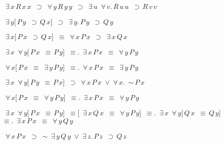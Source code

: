 \begin{description}
\item[\parbox{\textwidth}{X2122\index{X2122@X2122, {\bf Theorem}} }] \texttt{$ $ $\exists \,x \,R \,x \,x $ $\supset $ $\forall \,y \,R \,y \,y $ $\supset $ $\exists \,u $ $\forall \,v . \,R \,u \,u $ $\supset \,R \,v \,v$}


\item[\parbox{\textwidth}{X2123\index{X2123@X2123, {\bf Theorem}} }] \texttt{$ $ $\exists \,y [ \,P \,y $ $\supset \,Q \,x ] $ $\supset $ $\exists \,y . \,P \,y $ $\supset \,Q \,y$}


\item[\parbox{\textwidth}{X2124\index{X2124@X2124, {\bf Theorem}} }] \texttt{$ $ $\exists \,x [ \,P \,x $ $\supset \,Q \,x ] $ $\equiv $ $\forall \,x \,P \,x $ $\supset $ $\exists \,x \,Q \,x$}


\item[\parbox{\textwidth}{X2125\index{X2125@X2125, {\bf Theorem}} }] \texttt{$ $ $\exists \,x $ $\forall \,y [ \,P \,x $ $\equiv \,P \,y ] $ $\equiv . $ $\exists \,x \,P \,x $ $\equiv $ $\forall \,y \,P \,y$}


\item[\parbox{\textwidth}{X2126\index{X2126@X2126, {\bf Theorem}} }] \texttt{$ $ $\forall \,x [ \,P \,x $ $\equiv $ $\exists \,y \,P \,y ] $ $\equiv . $ $\forall \,x \,P \,x $ $\equiv $ $\exists \,y \,P \,y$}


\item[\parbox{\textwidth}{X2127\index{X2127@X2127, {\bf Theorem}} }] \texttt{$ $ $\exists \,x $ $\forall \,y [ \,P \,y $ $\equiv \,P \,x ] $ $\supset $ $\forall \,x \,P \,x $ $\lor $ $\forall \,x . $ $\sim \,P \,x$}


\item[\parbox{\textwidth}{X2128\index{X2128@X2128, {\bf Theorem}} }] \texttt{$ $ $\forall \,x [ \,P \,x $ $\equiv $ $\forall \,y \,P \,y ] $ $\equiv . $ $\exists \,x \,P \,x $ $\equiv $ $\forall \,y \,P \,y$}


\item[\parbox{\textwidth}{X2129\index{X2129@X2129, {\bf Theorem}} }] \texttt{$ $ $\exists \,x $ $\forall \,y [ \,P \,x $ $\equiv \,P \,y ] $ $\equiv [ $ $\exists \,x \,Q \,x $ $\equiv $ $\forall \,y \,P \,y ] $ $\equiv . $ $\exists \,x $ $\forall \,y [ \,Q \,x $ $\equiv \,Q \,y ] $ $\equiv . $ $\exists \,x \,P \,x $ $\equiv $ $\forall \,y \,Q \,y$}


\item[\parbox{\textwidth}{X2130\index{X2130@X2130, {\bf Theorem}} }] \texttt{$ $ $\forall \,x \,P \,x $ $\supset $ $\sim $ $\exists \,y \,Q \,y $ $\lor $ $\exists \,z . \,P \,z $ $\supset \,Q \,z$}



\end{description}
